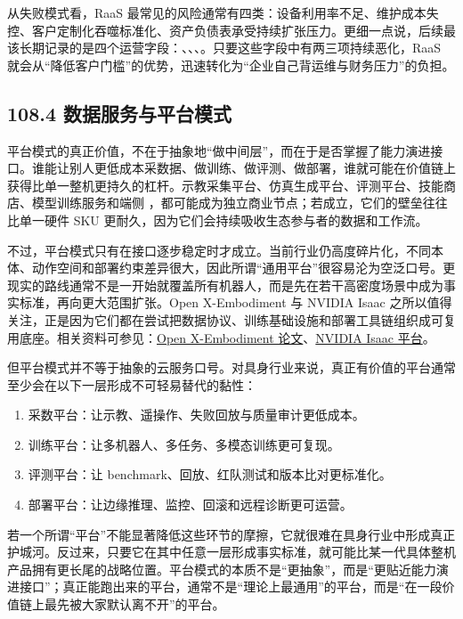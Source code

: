 从失败模式看，RaaS 最常见的风险通常有四类：设备利用率不足、维护成本失控、客户定制化吞噬标准化、资产负债表承受持续扩张压力。更细一点说，后续最该长期记录的是四个运营字段：\texttt{}、\texttt{}、\texttt{}、\texttt{}。只要这些字段中有两三项持续恶化，RaaS 就会从“降低客户门槛”的优势，迅速转化为“企业自己背运维与财务压力”的负担。

\subsection*{108.4 数据服务与平台模式}


平台模式的真正价值，不在于抽象地“做中间层”，而在于是否掌握了能力演进接口。谁能让别人更低成本采数据、做训练、做评测、做部署，谁就可能在价值链上获得比单一整机更持久的杠杆。示教采集平台、仿真生成平台、评测平台、技能商店、模型训练服务和端侧 \texttt{}，都可能成为独立商业节点；若成立，它们的壁垒往往比单一硬件 SKU 更耐久，因为它们会持续吸收生态参与者的数据和工作流。

不过，平台模式只有在接口逐步稳定时才成立。当前行业仍高度碎片化，不同本体、动作空间和部署约束差异很大，因此所谓“通用平台”很容易沦为空泛口号。更现实的路线通常不是一开始就覆盖所有机器人，而是先在若干高密度场景中成为事实标准，再向更大范围扩张。Open X-Embodiment 与 NVIDIA Isaac 之所以值得关注，正是因为它们都在尝试把数据协议、训练基础设施和部署工具链组织成可复用底座。相关资料可参见：\href{https://arxiv.org/abs/2310.08864}{Open X-Embodiment 论文}、\href{https://developer.nvidia.com/isaac}{NVIDIA Isaac 平台}。

但平台模式并不等于抽象的云服务口号。对具身行业来说，真正有价值的平台通常至少会在以下一层形成不可轻易替代的黏性：

\begin{enumerate}
\item 采数平台：让示教、遥操作、失败回放与质量审计更低成本。
\item 训练平台：让多机器人、多任务、多模态训练更可复现。
\item 评测平台：让 benchmark、回放、红队测试和版本比对更标准化。
\item 部署平台：让边缘推理、监控、回滚和远程诊断更可运营。
\end{enumerate}

若一个所谓“平台”不能显著降低这些环节的摩擦，它就很难在具身行业中形成真正护城河。反过来，只要它在其中任意一层形成事实标准，就可能比某一代具体整机产品拥有更长尾的战略位置。平台模式的本质不是“更抽象”，而是“更贴近能力演进接口”；真正能跑出来的平台，通常不是“理论上最通用”的平台，而是“在一段价值链上最先被大家默认离不开”的平台。


